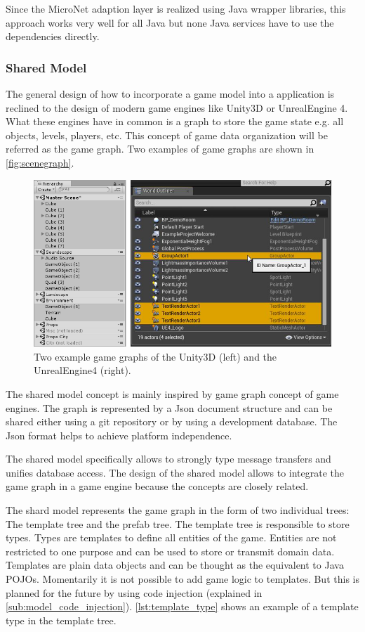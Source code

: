 Since the MicroNet adaption layer is realized using Java wrapper libraries,
this approach works very well for all Java \mss{} but none Java services have to
use the dependencies directly.

\subsubsection{Shared Model}
\label{subsub:shared_model}

The general design of how to incorporate a game model into a \mn{} application
is reclined to the design of modern game engines like Unity3D or UnrealEngine 4.
What these engines have in common is a graph to store the game state e.g. all
objects, levels, players, etc. This concept of game data organization will be
referred as the game graph. Two examples of game graphs are shown in
\autoref{fig:scenegraph}.

\begin{figure}
  \centering
  \includegraphics[width=\textwidth]{images/game_engine/scenegraph}
  \caption{Two example game graphs of the Unity3D (left) and the UnrealEngine4
  (right).}
  \label{fig:scenegraph}
\end{figure}

The shared model concept is mainly inspired by game graph concept of game
engines. The graph is represented by a Json document structure and can be shared
either using a git repository or by using a development database. The Json
format helps to achieve platform independence.

The shared model specifically allows to strongly type message transfers and
unifies database access. The design of the shared model allows to integrate the
game graph in a game engine because the concepts are closely related.

The shard model represents the game graph in the form of two individual trees:
The template tree and the prefab tree. The template tree is responsible to store
types. Types are templates to define all entities of the game. Entities are not
restricted to one purpose and can be used to store or transmit domain data.
Templates are plain data objects and can be thought as the equivalent to Java
POJOs. Momentarily it is not possible to add game logic to templates. But this
is planned for the future by using code injection (explained in
\autoref{sub:model_code_injection}). \autoref{lst:template_type} shows an
example of a template type in the template tree.

